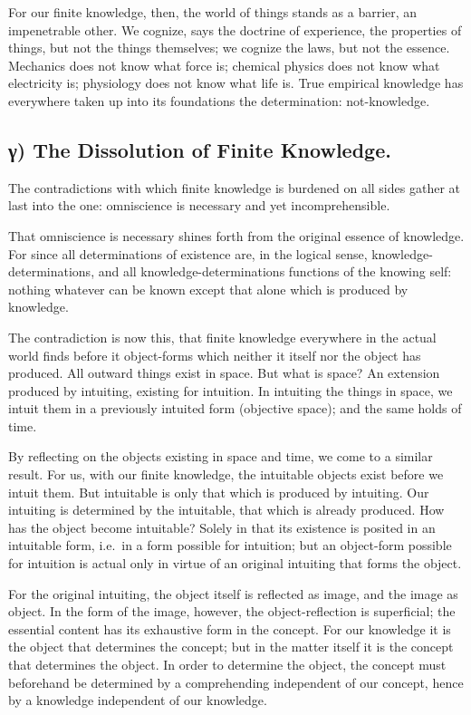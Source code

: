 \documentclass[12pt]{book}
\begin{document}
For our finite knowledge, then, the world of things stands as a
barrier, an impenetrable other. We cognize, says the doctrine of
experience, the properties of things, but not the things themselves;
we cognize the laws, but not the essence. Mechanics does not know
what force is; chemical physics does not know what electricity is;
physiology does not know what life is. True empirical knowledge has
everywhere taken up into its foundations the determination:
not-knowledge.

\subsection*{γ) The Dissolution of Finite Knowledge.}

The contradictions with which finite knowledge is burdened on all
sides gather at last into the one: omniscience is necessary and yet
incomprehensible.

That omniscience is necessary shines forth from the original essence
of knowledge. For since all determinations of existence are, in the
logical sense, knowledge-determinations, and all
knowledge-determinations functions of the knowing self: nothing
whatever can be known except that alone which is produced by
knowledge.

The contradiction is now this, that finite knowledge everywhere in
the actual world finds before it object-forms which neither it
itself nor the object has produced. All outward things exist in
space. But what is space? An extension produced by intuiting,
existing for intuition. In intuiting the things in space, we intuit
them in a previously intuited form (objective space); and the same
holds of time.

By reflecting on the objects existing in space and time, we come to
a similar result. For us, with our finite knowledge, the intuitable
objects exist before we intuit them. But intuitable is only that
which is produced by intuiting. Our intuiting is determined by the
intuitable, that which is already produced. How has the object
become intuitable? Solely in that its existence is posited in an
intuitable form, i.e.\ in a form possible for intuition; but an
object-form possible for intuition is actual only in virtue of an
original intuiting that forms the object.

For the original intuiting, the object itself is reflected as image,
and the image as object. In the form of the image, however, the
object-reflection is superficial; the essential content has its
exhaustive form in the concept. For our knowledge it is the object
that determines the concept; but in the matter itself it is the
concept that determines the object. In order to determine the
object, the concept must beforehand be determined by a comprehending
independent of our concept, hence by a knowledge independent of our
knowledge.
\end{document}
